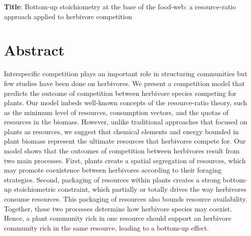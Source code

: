 \documentclass[12pt]{article}
\begin{document}
\begin{large}
\noindent \textbf{Title}: Bottom-up stoichiometry at the base of the food-web: a resource-ratio approach applied to herbivore competition  
\end{large}

\section*{Abstract}


Interspecific competition plays an important role in structuring communities but few studies have been done on herbivores. We present a competition model that predicts the outcome of competition between herbivore species competing for plants. Our model imbeds well-known concepts of the resource-ratio theory, such as the minimum level of resources, consumption vectors, and the quotas of resources in the biomass. However, unlike traditional approaches that focused on plants as resources, we suggest that chemical elements and energy bounded in plant biomass represent the ultimate resources that herbivores compete for. Our model shows that the outcomes of competition between herbivores result from two main processes. First, plants create a spatial segregation of resources, which may promote coexistence between herbivores according to their foraging strategies. Second, packaging of resources within plants creates a strong bottom-up stoichiometric constraint, which partially or totally drives the way herbivores consume resources. This packaging of resources also bounds resource availability. Together, these two processes determine how herbivore species may coexist. Hence, a plant community rich in one resource should support an herbivore community rich in the same resource, leading to a bottom-up effect.
\end{document}
